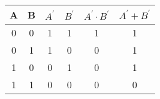\begin{tabular}[12pt]{|c |c |c |c |c |c |}
\hline
{A} & {B} & {$A^\prime$} & {$B^\prime$} & {$A^{\prime}\cdot B^{\prime}$} & {$A^\prime + B^\prime$} \\
\hline
 0 & 0 & 1 & 1 & 1 & 1 \\
\hline
0 & 1 & 1 & 0 & 0 & 1 \\
\hline
1 & 0 & 0 & 1 & 0 & 1 \\
\hline
1 & 1 & 0 & 0 & 0 & 0 \\
\hline
\end{tabular}
